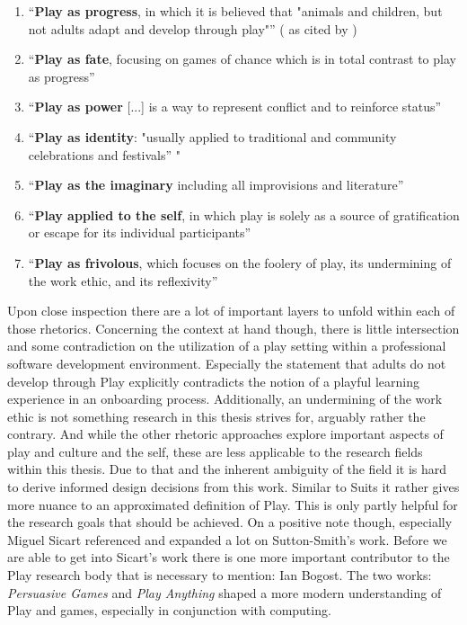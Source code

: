 \begin{enumerate}
  \item{\enquote{\textbf{Play as progress}, in which it is believed that "animals and children, but not adults adapt and develop through play"} (\cite[p. 8]{sutton2009ambiguity} as cited by \cite[p. 213]{wein2000suttonreview})}
  \item{\enquote{\textbf{Play as fate}, focusing on games of chance which is in total contrast to play as progress} \cite[p. 213]{wein2000suttonreview}}
  \item{\enquote{\textbf{Play as power} [...] is a way to represent conflict and to reinforce status} \cite[p. 213]{wein2000suttonreview}}
  \item{\enquote{\textbf{Play as identity}: "usually applied to traditional and community celebrations and festivals} \cite[p. 10]{sutton2009ambiguity}" \cite[p. 213]{wein2000suttonreview}}
  \item{\enquote{\textbf{Play as the imaginary} including all improvisions and literature} \cite[p. 213]{wein2000suttonreview}}
  \item{\enquote{\textbf{Play applied to the self}, in which play is solely as a source of gratification or escape for its individual participants} \cite[p. 213]{wein2000suttonreview}}
  \item{\enquote{\textbf{Play as frivolous}, which focuses on the foolery of play, its undermining of the work ethic, and its reflexivity} \cite[p. 213]{wein2000suttonreview}}
\end{enumerate}

Upon close inspection there are a lot of important layers to unfold within each of those rhetorics. Concerning the context at hand though, there is little intersection and some contradiction on the utilization of a play setting within a professional software development environment. Especially the statement that adults do not develop through Play explicitly contradicts the notion of a playful learning experience in an onboarding process. Additionally, an undermining of the work ethic is not something research in this thesis strives for, arguably rather the contrary. And while the other rhetoric approaches explore important aspects of play and culture and the self, these are less applicable to the research fields within this thesis. Due to that and the inherent ambiguity of the field it is hard to derive informed design decisions from this work. Similar to Suits it rather gives more nuance to an approximated definition of Play. This is only partly helpful for the research goals that should be achieved. On a positive note though, especially Miguel Sicart referenced and expanded a lot on Sutton-Smith's work. Before we are able to get into Sicart's work there is one more important contributor to the Play research body that is necessary to mention: Ian Bogost. The two works: \textit{Persuasive Games} and \textit{Play Anything} shaped a more modern understanding of Play and games, especially in conjunction with computing.

